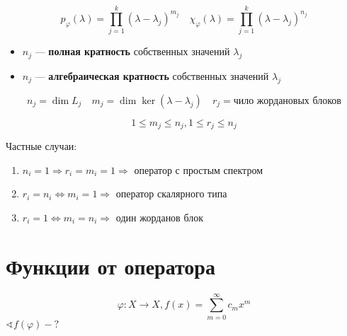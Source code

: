$$p_\varphi(\lambda) = \prod_{j=1}^k (\lambda-\lambda_j)^{m_j} \quad \chi_\varphi(\lambda) = \prod_{j=1}^k (\lambda - \lambda_j)^{n_j}$$
\begin{definition}
    \begin{itemize}
        \item $n_j$ --- \textbf{полная кратность} собственных значений $\lambda_j$
        \item $n_j$ --- \textbf{алгебраическая кратность} собственных значений $\lambda_j$
    \end{itemize}
\end{definition}

$$n_j = \dim L_j \quad m_j = \dim \ker(\lambda-\lambda_j) \quad r_j = \text{чило жордановых блоков}$$

\begin{lemma}
    $$1\leq m_j\leq n_j, 1\leq r_j\leq n_j$$
\end{lemma}

Частные случаи:
\begin{enumerate}
    \item $n_i=1 \Rightarrow r_i=m_i=1 \Rightarrow$ оператор с простым спектром
    \item $r_i = n_i \Leftrightarrow m_i = 1 \Rightarrow$ оператор скалярного типа
    \item $r_i = 1 \Leftrightarrow m_i=n_i \Rightarrow$ один жорданов блок
\end{enumerate}

\section*{Функции от оператора}

$$\varphi : X\to X, f(x) = \sum_{m=0}^\infty c_m x^m$$
$\sphericalangle f(\varphi)-?$

